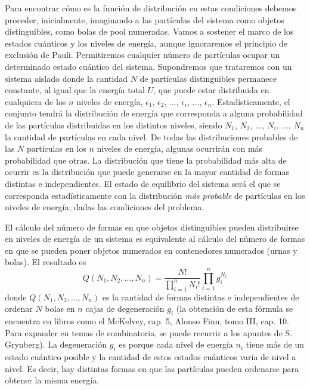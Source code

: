 \documentclass[12pt,a4paper]{article}
\def\e{{\epsilon}} %
\begin{document}
Para encontrar cómo es la función de distribución en estas condiciones debemos proceder, inicialmente, imaginando a las partículas del sistema como objetos distinguibles, como bolas de pool numeradas. Vamos a sostener el marco de los estados cuánticos y los niveles de energía, aunque ignoraremos el principio de exclusión de Pauli. Permitiremos cualquier número de partículas ocupar un determinado estado cuántico del sistema. Supondremos que trataremos con un sistema aislado donde la cantidad $N$ de partículas distinguibles permanece constante, al igual que la energía total $U$, que puede estar distribuida en cualquiera de los $n$ niveles de energía, $\e_{1}$, $\e_{2}$, $\ldots$, $\e_{i}$, $\ldots$, $\e_{n}$. Estadísticamente, el conjunto tendrá la distribución de energía que corresponda a alguna probabilidad de las partículas distribuidas en los distintos niveles, siendo $N_{1}$, $N_{2}$, $\ldots$, $N_{i}$, $\ldots$, $N_{n}$ la cantidad de partículas en cada nivel. De todas las distribuciones probables de las $N$ partículas en los $n$ niveles de energía, algunas ocurrirán con más probabilidad que otras. La distribución que tiene la probabilidad más alta de ocurrir es la distribución que puede generarse en la mayor cantidad de formas distintas e independientes. El estado de equilibrio del sistema será el que se corresponda estadísticamente con la distribución \emph{más probable} de partículas en los niveles de energía, dadas las condiciones del problema.

El cálculo del número de formas en que objetos distinguibles pueden distribuirse en niveles de energía de un sistema es equivalente al cálculo del número de formas en que se pueden poner objetos numerados en contenedores numerados (urnas y bolas). El resultado es
\[ Q(N_{1},N_{2},\ldots,N_{n})=\dfrac{N!}{\prod _{i=1}^{n}N_{i}!} \prod _{i=1}^{n} g_{i}^{N_{i}} \]
donde $Q(N_{1},N_{2},\ldots,N_{n})$ es la cantidad de formas distintas e independientes de ordenar $N$ bolas en $n$ cajas de degeneración $g_{i}$ (la obtención de esta fórmula se encuentra en libros como el McKelvey, cap. 5, Alonso Finn, tomo III, cap. 10. Para expander en temas de combinatoria, se puede recurrir a los apuntes de S. Grynberg). La degeneración $g_{i}$ es porque cada nivel de energía $n_{i}$ tiene más de un estado cuántico posible y la cantidad de estos estados cuánticos varía de nivel a nivel. Es decir, hay distintas formas en que las partículas pueden ordenarse para obtener la misma energía.
\end{document}
